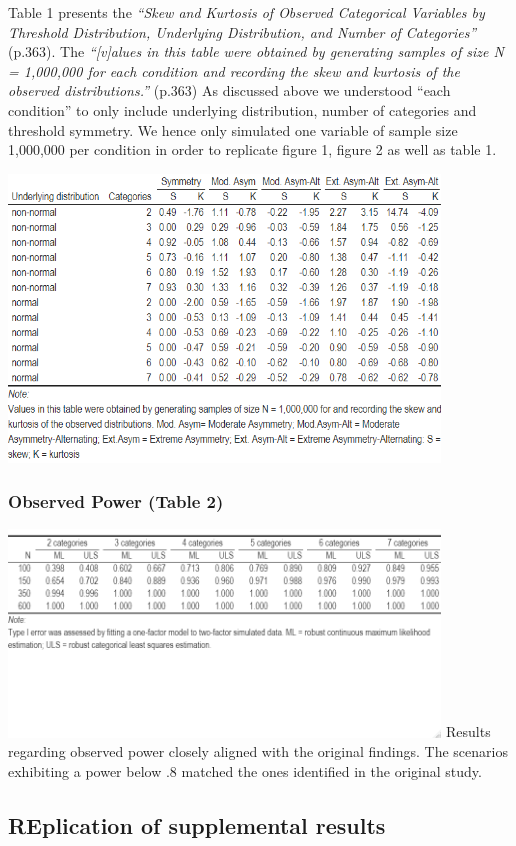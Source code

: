 \documentclass[10,a4paperpaper,]{article}
\begin{document}
Table 1 presents the \emph{``Skew and Kurtosis of Observed Categorical
Variables by Threshold Distribution, Underlying Distribution, and Number
of Categories''} (p.363). The \emph{``{[}v{]}alues in this table were
obtained by generating samples of size N = 1,000,000 for each condition
and recording the skew and kurtosis of the observed distributions.''}
(p.363) As discussed above we understood ``each condition'' to only
include underlying distribution, number of categories and threshold
symmetry. We hence only simulated one variable of sample size 1,000,000
per condition in order to replicate figure 1, figure 2 as well as table
1.

\includegraphics[width=325pt]{./figures/table1}

\subsubsection{Observed Power (Table 2)}

\includegraphics[width=325pt]{./figures/table2} Results regarding
observed power closely aligned with the original findings. The scenarios
exhibiting a power below .8 matched the ones identified in the original
study.

\subsection{REplication of supplemental results}
\end{document}
